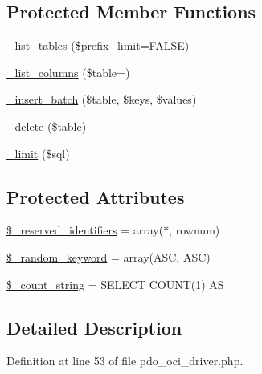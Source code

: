 \subsection*{Protected Member Functions}
\begin{DoxyCompactItemize}
\item 
\mbox{\hyperlink{class_c_i___d_b__pdo__oci__driver_a435c0f3ce54fe7daa178baa8532ebd54}{\+\_\+list\+\_\+tables}} (\$prefix\+\_\+limit=F\+A\+L\+SE)
\item 
\mbox{\hyperlink{class_c_i___d_b__pdo__oci__driver_a7ccb7f9c301fe7f0a9db701254142b63}{\+\_\+list\+\_\+columns}} (\$table=\textquotesingle{}\textquotesingle{})
\item 
\mbox{\hyperlink{class_c_i___d_b__pdo__oci__driver_a1978e1358c812587a46e242630365099}{\+\_\+insert\+\_\+batch}} (\$table, \$keys, \$values)
\item 
\mbox{\hyperlink{class_c_i___d_b__pdo__oci__driver_a133ea8446ded52589bd22cc9163d0896}{\+\_\+delete}} (\$table)
\item 
\mbox{\hyperlink{class_c_i___d_b__pdo__oci__driver_a3a02ea06541b8ecc25a33a61651562c8}{\+\_\+limit}} (\$sql)
\end{DoxyCompactItemize}
\subsection*{Protected Attributes}
\begin{DoxyCompactItemize}
\item 
\mbox{\hyperlink{class_c_i___d_b__pdo__oci__driver_aa3298c4c62fbee8bb09f1b75b633fb0d}{\$\+\_\+reserved\+\_\+identifiers}} = array(\textquotesingle{}$\ast$\textquotesingle{}, \textquotesingle{}rownum\textquotesingle{})
\item 
\mbox{\hyperlink{class_c_i___d_b__pdo__oci__driver_a10213aa6e05f6d924d3277bb1d2fea00}{\$\+\_\+random\+\_\+keyword}} = array(\textquotesingle{}A\+SC\textquotesingle{}, \textquotesingle{}A\+SC\textquotesingle{})
\item 
\mbox{\hyperlink{class_c_i___d_b__pdo__oci__driver_a06c80bac2ecbd0557827e96949c23097}{\$\+\_\+count\+\_\+string}} = \textquotesingle{}S\+E\+L\+E\+CT C\+O\+U\+NT(1) AS \textquotesingle{}
\end{DoxyCompactItemize}


\subsection{Detailed Description}


Definition at line 53 of file pdo\+\_\+oci\+\_\+driver.\+php.



